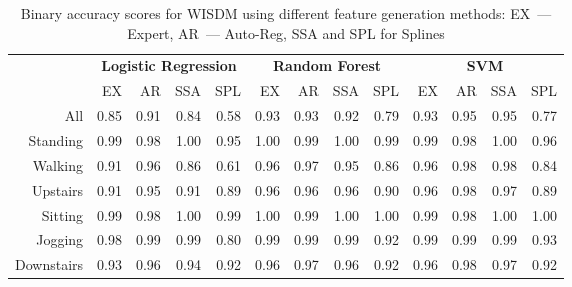 \documentclass[a4paper,12pt]{article}
\begin{document}
\begin{table}[!h]
	\centering
	\caption{Binary accuracy scores for WISDM using different feature generation methods: EX~--- Expert, AR~--- Auto-Reg, SSA and  SPL for Splines}
	\footnotesize
	\begin{tabular}{r|rrrr|rrrr|rrrr|}
		& \multicolumn{4}{c|}{\textbf{Logistic Regression}} & \multicolumn{4}{c|}{\textbf{Random Forest}} & \multicolumn{4}{c|}{\textbf{SVM}}          \\ \cline{2-13} 
		& EX   & AR   & SSA   & SPL  & EX  & AR & SSA & SPL & EX & AR & SSA & SPL \\ \hline
		All& 0.85 & 0.91 & 0.84 & 0.58 & 0.93 & 0.93 & 0.92 & 0.79 & 0.93 & 0.95 & 0.95 & 0.77 \\
		Standing& 0.99 & 0.98 & 1.00 & 0.95 & 1.00 & 0.99 & 1.00 & 0.99 & 0.99 & 0.98 & 1.00 & 0.96 \\
		Walking& 0.91 & 0.96 & 0.86 & 0.61 & 0.96 & 0.97 & 0.95 & 0.86 & 0.96 & 0.98 & 0.98 & 0.84 \\
		Upstairs& 0.91 & 0.95 & 0.91 & 0.89 & 0.96 & 0.96 & 0.96 & 0.90 & 0.96 & 0.98 & 0.97 & 0.89 \\
		Sitting& 0.99 & 0.98 & 1.00 & 0.99 & 1.00 & 0.99 & 1.00 & 1.00 & 0.99 & 0.98 & 1.00 & 1.00 \\
		Jogging& 0.98 & 0.99 & 0.99 & 0.80 & 0.99 & 0.99 & 0.99 & 0.92 & 0.99 & 0.99 & 0.99 & 0.93 \\
		Downstairs& 0.93 & 0.96 & 0.94 & 0.92 & 0.96 & 0.97 & 0.96 & 0.92 & 0.96 & 0.98 & 0.97 & 0.92 \\ \hline
	\end{tabular}
	\label{tbl::wisdm_methods_results}
\end{table}
\end{document}

